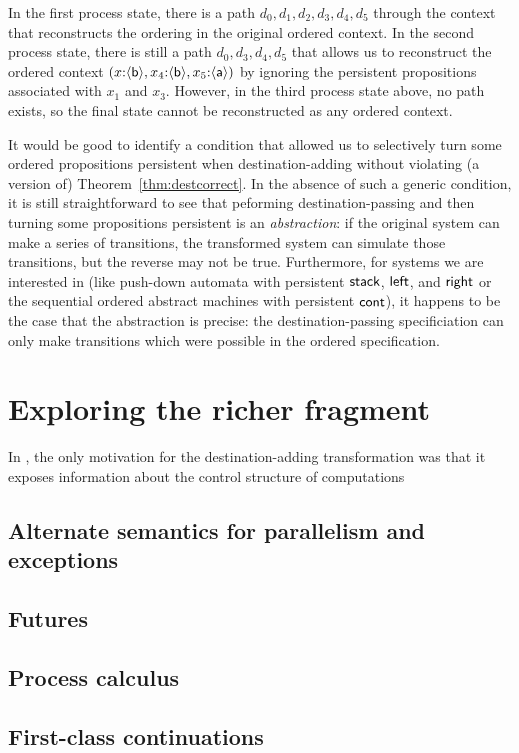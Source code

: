 In the
first process state, there is a path $d_0, d_1, d_2, d_3, d_4, d_5$ through
the context that reconstructs the ordering in the original ordered context.
In the second process state, there is still a path $d_0, d_3, d_4, d_5$ that
allows us to reconstruct the ordered context
$(x{:}\langle {\sf b} \rangle,
  x_4{:}\langle {\sf b} \rangle, x_5{:}\langle {\sf a} \rangle)$ by ignoring the persistent
propositions associated with $x_1$ and $x_3$. 
However, in the third process state above, no path exists, so the final
state cannot be reconstructed as any ordered context. 

It would be good to identify a condition that allowed us to
selectively turn some ordered propositions persistent when
destination-adding without violating (a version of)
Theorem~\ref{thm:destcorrect}. In the absence of such a generic
condition, it is still straightforward to see that peforming
destination-passing and then turning some propositions persistent is
an {\it abstraction}: if the original system can make a series of
transitions, the transformed system can simulate those transitions,
but the reverse may not be true. Furthermore, for systems we are
interested in (like push-down automata with persistent ${\sf stack}$,
${\sf left}$, and ${\sf right}$ or the sequential ordered abstract
machines with persistent ${\sf cont}$), it happens to be the case that
the abstraction is precise: the destination-passing specificiation can
only make transitions which were possible in the ordered
specification.

\section{Exploring the richer fragment}

In \cite{simmons11logical}, the only motivation for the
destination-adding transformation was that it exposes information
about the control structure of computations 

\subsection{Alternate semantics for parallelism and exceptions}
\label{sec:modular-parallelism}



\subsection{Futures}



\subsection{Process calculus}



\subsection{First-class continuations}





